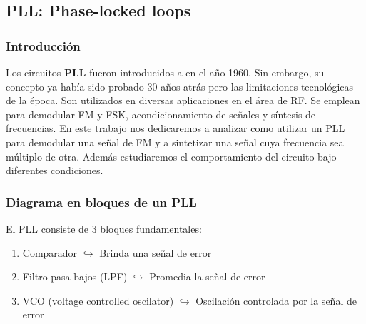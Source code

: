 	\subsection{PLL: Phase-locked loops}
	\subsubsection{Introducción}
	Los circuitos \textbf{PLL} fueron introducidos a en el año 1960. Sin embargo, su concepto ya había sido probado 30 años atrás pero las limitaciones tecnológicas de la época. Son utilizados en diversas aplicaciones en el área de RF. Se emplean para demodular FM y FSK, acondicionamiento de señales y síntesis de frecuencias. En este trabajo nos dedicaremos a analizar como utilizar un PLL para demodular una señal de FM y a sintetizar una señal cuya frecuencia sea múltiplo de otra. Además estudiaremos el comportamiento del circuito bajo diferentes condiciones.
	
	\subsubsection{Diagrama en bloques de un PLL}
	El PLL consiste de 3 bloques fundamentales:
	
	\begin{enumerate}
		\item  Comparador $\hookrightarrow$ Brinda una señal de error
		\item  Filtro pasa bajos (LPF) $\hookrightarrow$ Promedia la señal de error
		\item  VCO (voltage controlled oscilator) $\hookrightarrow$ Oscilación controlada por la señal de error 
	\end{enumerate}
	
